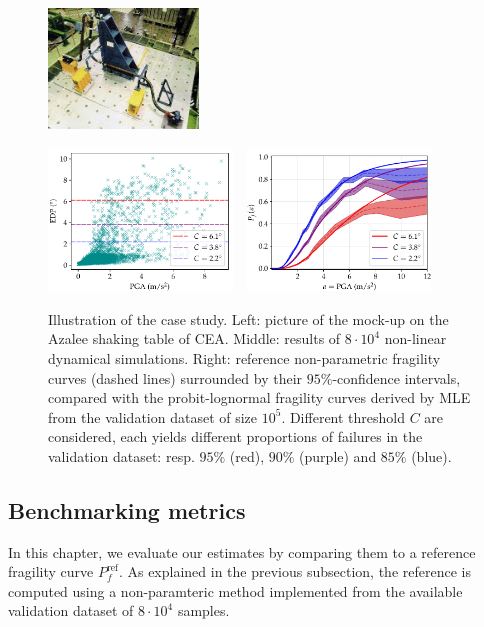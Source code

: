 \begin{figure}[h]
    \centering
    \parbox[b][3.8cm][c]{4.5cm}{%
    \includegraphics[height=3.2cm]{figures/intro-frags/ASG.jpg}\vspace*{1em}%
    }
    \includegraphics[height=3.8cm]{figures/intro-frags/asg/cloud_PGA_light.pdf}\ \ 
    \includegraphics[height=3.8cm]{figures/intro-frags/asg/refs_PGA.pdf}
    \caption{Illustration of the case study. Left: picture of the mock-up on the Azalee shaking table of CEA. Middle: results of $8\cdot10^4$ non-linear dynamical simulations. Right: reference non-parametric fragility curves (dashed lines) surrounded by their $95\%$-confidence intervals, compared with the probit-lognormal fragility curves derived by MLE from the validation dataset of size $10^5$. Different threshold $C$ are considered, each yields different proportions of failures in the validation dataset: resp. $95\%$ (red), $90\%$ (purple) and $85\%$ (blue).}
    \label{fig:constr-frag:asg}
\end{figure}



\subsection{Benchmarking metrics}\label{sec:constr-frags:subsec:benchmarking}


In this chapter, we evaluate our estimates by comparing them to a reference fragility curve $P^{\text{ref}}_f$. As explained in the previous subsection, the reference is computed using a non-paramteric method implemented from the available validation dataset of $8\cdot 10^4$ samples.

